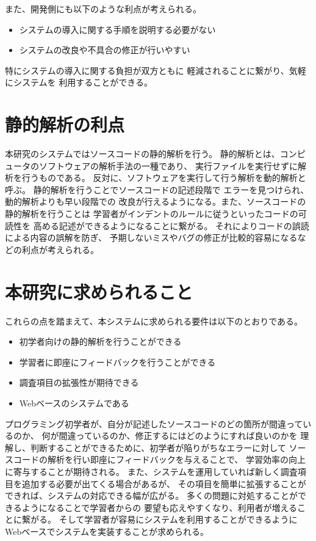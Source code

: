 \documentclass{csspaper}
\begin{document}
      また、開発側にも以下のような利点が考えられる。

      \begin{itemize}
         \item システムの導入に関する手順を説明する必要がない
         \item システムの改良や不具合の修正が行いやすい
      \end{itemize}

      特にシステムの導入に関する負担が双方ともに
      軽減されることに繋がり、気軽にシステムを
      利用することができる。

      \section{静的解析の利点}
      本研究のシステムではソースコードの静的解析を行う。
      静的解析とは、コンピュータのソフトウェアの解析手法の一種であり、
      実行ファイルを実行せずに解析を行うものである。
      反対に、ソフトウェアを実行して行う解析を動的解析と呼ぶ。
      静的解析を行うことでソースコードの記述段階で
      エラーを見つけられ、動的解析よりも早い段階での
      改良が行えるようになる。また、ソースコードの静的解析を行うことは
      学習者がインデントのルールに従うといったコードの可読性を
      高める記述ができるようになることに繋がる。
      それによりコードの誤読による内容の誤解を防ぎ、
      予期しないミスやバグの修正が比較的容易になるなどの利点が考えられる。

      \section{本研究に求められること}
      これらの点を踏まえて、本システムに求められる要件は以下のとおりである。
      \begin{itemize}
         \item 初学者向けの静的解析を行うことができる
         \item 学習者に即座にフィードバックを行うことができる
         \item 調査項目の拡張性が期待できる
         \item Webベースのシステムである
      \end{itemize}
      プログラミング初学者が、自分が記述したソースコードのどの箇所が間違っているのか、
      何が間違っているのか、修正するにはどのようにすれば良いのかを
      理解し、判断することができるために、初学者が陥りがちなエラーに対して
      ソースコードの解析を行い即座にフィードバックを与えることで、
      学習効率の向上に寄与することが期待される。
      また、システムを運用していれば新しく調査項目を追加する必要が出てくる場合があるが、
      その項目を簡単に拡張することができれば、システムの対応できる幅が広がる。
      多くの問題に対処することができるようになることで学習者からの
      要望も応えやすくなり、利用者が増えることに繋がる。
      そして学習者が容易にシステムを利用することができるように
      Webベースでシステムを実装することが求められる。
\end{document}
